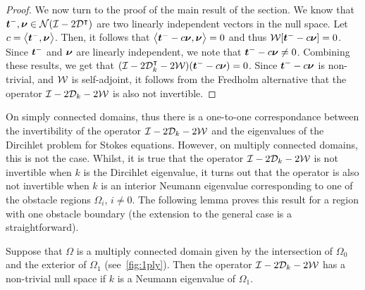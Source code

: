 \begin{proof}
We now turn to the proof of the main result of the section.
We know that ${\boldsymbol t}^{-}, {\boldsymbol \nu} \in {\mathcal N}(\mathcal I - 2{\mathcal D}^{\intercal})$ are two linearly independent
vectors in the null space.
Let $c = \left< {\boldsymbol t}^{-},{\boldsymbol \nu} \right>$. Then, it follows that 
$\left<{\boldsymbol t}^{-} -c {\boldsymbol \nu}, {\boldsymbol \nu} \right> = 0$ and thus
${\mathcal W}[{\boldsymbol t}^{-} - c{\boldsymbol \nu}] = 0$. 
Since ${\boldsymbol t}^{-}$ and ${\boldsymbol \nu}$ are linearly independent, we note that
${\boldsymbol t}^{-} -c{\boldsymbol \nu} \neq 0$.
Combining these results, we get that
$(\mathcal I - 2{\mathcal D}^{\intercal}_{k} - 2{\mathcal W}) ({\boldsymbol t}^{-} - c{\boldsymbol \nu}) = 0$. 
Since ${\boldsymbol t}^{-}-c{\boldsymbol \nu}$ is non-trivial, and ${\mathcal W}$ is self-adjoint, 
it follows from the Fredholm alternative
that the operator $\mathcal I - 2{\mathcal D}_{k} - 2{\mathcal W}$ is also not invertible.
\end{proof}

On simply connected domains, thus there is a one-to-one correspondance
between the invertibility of the operator $\mathcal I - 2{\mathcal D}_{k} - 2{\mathcal W}$ 
and the eigenvalues of the Dircihlet problem for Stokes equations. 
However, on multiply connected domains, this is not the case.
Whilst, it is true that the operator $\mathcal I -2{\mathcal D}_{k} -2{\mathcal W}$ 
is not invertible when $k$ is the Dircihlet eigenvalue, it turns
out that the operator is also not invertible when $k$ is 
an interior Neumann eigenvalue corresponding to one of the obstacle
regions $\Omega_{i}$, $i\neq 0$.
The following lemma proves this result for a region with one obstacle
boundary (the extension to the general case is a straightforward).

\begin{lemma}
Suppose that $\Omega$ is a multiply connected domain given by the 
intersection of $\Omega_{0}$ and the exterior of $\Omega_{1}$
(see~\cref{fig:1ply}). 
Then the operator $\mathcal I - 2{\mathcal D}_{k} - 2{\mathcal W}$ has a non-trivial
null space if $k$ is a Neumann eigenvalue of $\Omega_{1}$.
\end{lemma}

